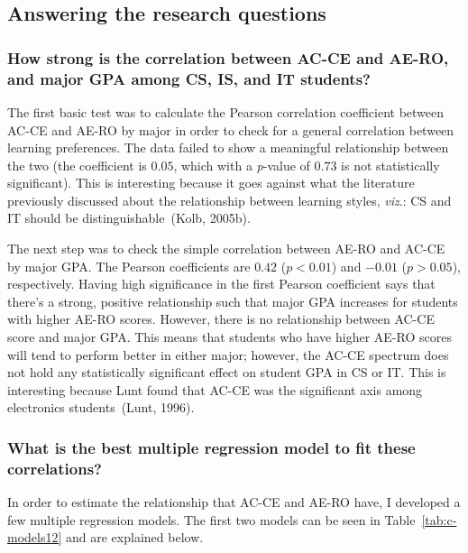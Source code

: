 \subsection{Answering the research questions}
\subsubsection{How strong is the correlation between AC-CE and AE-RO, and major GPA among CS, IS, and IT students?}
The first basic test was to calculate the Pearson correlation coefficient between AC-CE and AE-RO by major in order to check for a general correlation between learning preferences. The data failed to show a meaningful relationship between the two (the coefficient is $0.05$, which with a \textit{p}-value of $0.73$ is not statistically significant). This is interesting because it goes against what the literature previously discussed about the relationship between learning styles, \textit{viz}.: CS and IT should be distinguishable~(Kolb, 2005b).

The next step was to check the simple correlation between AE-RO and AC-CE by major GPA. The Pearson coefficients are $0.42$ ($p<0.01$) and $-0.01$ ($p>0.05$), respectively. Having high significance in the first Pearson coefficient says that there's a strong, positive relationship such that major GPA increases for students with higher AE-RO scores. However, there is no relationship between AC-CE score and major GPA. This means that students who have higher AE-RO scores will tend to perform better in either major; however, the AC-CE spectrum does not hold any statistically significant effect on student GPA in CS or IT. This is interesting because Lunt found that AC-CE was the significant axis among electronics students~(Lunt, 1996).

\subsubsection{What is the best multiple regression model to fit these correlations?}
In order to estimate the relationship that AC-CE and AE-RO have, I developed a few multiple regression models. The first two models can be seen in Table~\ref{tab:c-models12} and are explained below.

